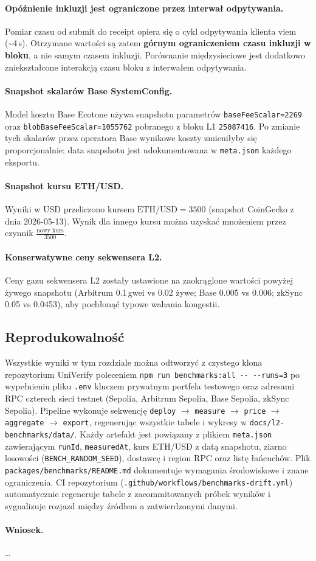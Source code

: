 \documentclass[11pt,a4paper]{article}
\begin{document}
\paragraph{Opóźnienie inkluzji jest ograniczone przez interwał odpytywania.} Pomiar czasu od submit do receipt opiera się o cykl odpytywania klienta viem (\textasciitilde 4\,s). Otrzymane wartości są zatem \textbf{górnym ograniczeniem czasu inkluzji w bloku}, a nie samym czasem inkluzji. Porównanie międzysieciowe jest dodatkowo zniekształcone interakcją czasu bloku z interwałem odpytywania.

\paragraph{Snapshot skalarów Base SystemConfig.} Model kosztu Base Ecotone używa snapshotu parametrów \texttt{baseFeeScalar=2269} oraz \texttt{blobBaseFeeScalar=1055762} pobranego z bloku L1 \texttt{25087416}. Po zmianie tych skalarów przez operatora Base wynikowe koszty zmieniłyby się proporcjonalnie; data snapshotu jest udokumentowana w \texttt{meta.json} każdego eksportu.

\paragraph{Snapshot kursu ETH/USD.} Wyniki w USD przeliczono kursem $\text{ETH}/\text{USD} = 3500$ (snapshot CoinGecko z dnia 2026-05-13). Wynik dla innego kursu można uzyskać mnożeniem przez czynnik $\frac{\text{nowy kurs}}{3500}$.

\paragraph{Konserwatywne ceny sekwensera L2.} Ceny gazu sekwensera L2 zostały ustawione na zaokrąglone wartości powyżej żywego snapshotu (Arbitrum 0.1\,gwei vs 0.02 żywe; Base 0.005 vs 0.006; zkSync 0.05 vs 0.0453), aby pochłonąć typowe wahania kongestii.

\subsection{Reprodukowalność}

Wszystkie wyniki w tym rozdziale można odtworzyć z czystego klona repozytorium UniVerify poleceniem \texttt{npm run benchmarks:all -{}- -{}-runs=3} po wypełnieniu pliku \texttt{.env} kluczem prywatnym portfela testowego oraz adresami RPC czterech sieci testnet (Sepolia, Arbitrum Sepolia, Base Sepolia, zkSync Sepolia). Pipeline wykonuje sekwencję \texttt{deploy} $\to$ \texttt{measure} $\to$ \texttt{price} $\to$ \texttt{aggregate} $\to$ \texttt{export}, regenerując wszystkie tabele i wykresy w \texttt{docs/l2-benchmarks/data/}. Każdy artefakt jest powiązany z plikiem \texttt{meta.json} zawierającym \texttt{runId}, \texttt{measuredAt}, kurs ETH/USD z datą snapshotu, ziarno losowości (\texttt{BENCH\_RANDOM\_SEED}), dostawcę i region RPC oraz listę łańcuchów. Plik \texttt{packages/benchmarks/README.md} dokumentuje wymagania środowiskowe i znane ograniczenia. CI repozytorium (\texttt{.github/workflows/benchmarks-drift.yml}) automatycznie regeneruje tabele z zacommitowanych próbek wyników i sygnalizuje rozjazd między źródłem a zatwierdzonymi danymi.

\paragraph{Wniosek.}
\dots{}
\end{document}
